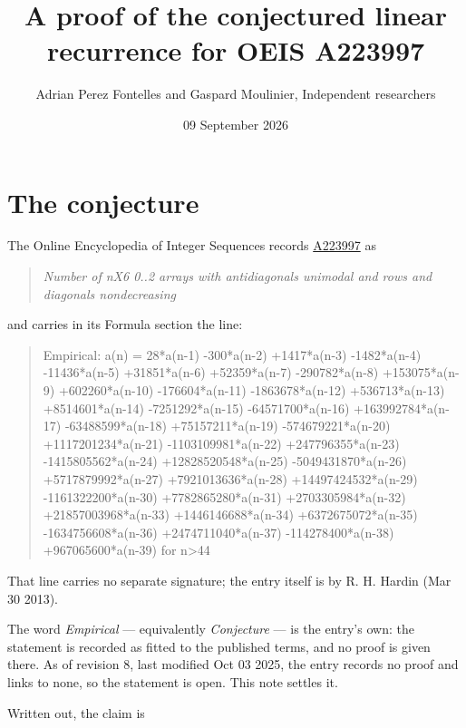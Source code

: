 \documentclass[11pt]{article}
\title{A proof of the conjectured linear recurrence for OEIS A223997}
\author{Adrian Perez Fontelles and Gaspard Moulinier, Independent researchers}
\date{09 September 2026}
\theoremstyle{definition}
\begin{document}
\maketitle
\section{The conjecture}

The Online Encyclopedia of Integer Sequences records \href{https://oeis.org/A223997}{A223997} as

\begin{quote}\itshape Number of nX6 0..2 arrays with antidiagonals unimodal and rows and diagonals nondecreasing\end{quote}

and carries in its Formula section the line:

\begin{quote}\ttfamily Empirical: a(n) = 28*a(n-1) -300*a(n-2) +1417*a(n-3) -1482*a(n-4) -11436*a(n-5) +31851*a(n-6) +52359*a(n-7) -290782*a(n-8) +153075*a(n-9) +602260*a(n-10) -176604*a(n-11) -1863678*a(n-12) +536713*a(n-13) +8514601*a(n-14) -7251292*a(n-15) -64571700*a(n-16) +163992784*a(n-17) -63488599*a(n-18) +75157211*a(n-19) -574679221*a(n-20) +1117201234*a(n-21) -1103109981*a(n-22) +247796355*a(n-23) -1415805562*a(n-24) +12828520548*a(n-25) -5049431870*a(n-26) +5717879992*a(n-27) +7921013636*a(n-28) +14497424532*a(n-29) -1161322200*a(n-30) +7782865280*a(n-31) +2703305984*a(n-32) +21857003968*a(n-33) +1446146688*a(n-34) +6372675072*a(n-35) -1634756608*a(n-36) +2474711040*a(n-37) -114278400*a(n-38) +967065600*a(n-39) for n>44\end{quote}

That line carries no separate signature; the entry itself is by R. H. Hardin (Mar 30 2013).

The word {\itshape Empirical} --- equivalently {\itshape Conjecture} --- is the entry's own: the statement is recorded as fitted to the published terms, and no proof is given there. As of revision 8, last modified Oct 03 2025, the entry records no proof and links to none, so the statement is open. This note settles it.

Written out, the claim is
\end{document}
